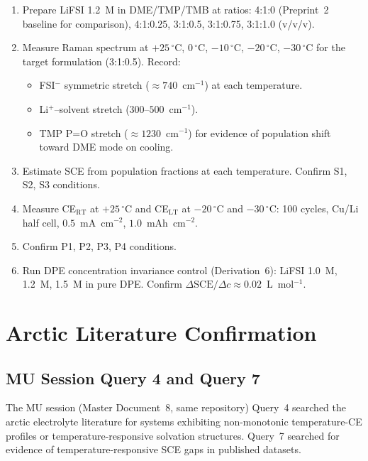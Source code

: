 \documentclass[11pt]{article}
\theoremstyle{plain}
\theoremstyle{definition}
\theoremstyle{remark}
\begin{document}
\begin{enumerate}[leftmargin=2em]
  \item Prepare LiFSI 1.2~M in DME/TMP/TMB at ratios:
        4:1:0 (Preprint~2 baseline for comparison),
        4:1:0.25, 3:1:0.5, 3:1:0.75, 3:1:1.0 (v/v/v).
  \item Measure Raman spectrum at $+25\,^\circ$C, $0\,^\circ$C,
        $-10\,^\circ$C, $-20\,^\circ$C, $-30\,^\circ$C for the
        target formulation (3:1:0.5).  Record:
    \begin{itemize}
      \item FSI$^-$ symmetric stretch ($\approx 740$~cm$^{-1}$)
            at each temperature.
      \item Li$^+$--solvent stretch ($300$--$500$~cm$^{-1}$).
      \item TMP P=O stretch ($\approx 1230$~cm$^{-1}$) for
            evidence of population shift toward DME mode on cooling.
    \end{itemize}
  \item Estimate SCE from population fractions at each temperature.
        Confirm S1, S2, S3 conditions.
  \item Measure CE$_\mathrm{RT}$ at $+25\,^\circ$C and
        CE$_\mathrm{LT}$ at $-20\,^\circ$C and $-30\,^\circ$C:
        100 cycles, Cu/Li half cell,
        $0.5$~mA~cm$^{-2}$, $1.0$~mAh~cm$^{-2}$.
  \item Confirm P1, P2, P3, P4 conditions.
  \item Run DPE concentration invariance control (Derivation~6):
        LiFSI 1.0~M, 1.2~M, 1.5~M in pure DPE.
        Confirm $\Delta\mathrm{SCE}/\Delta c \approx 0.02$~L~mol$^{-1}$.
\end{enumerate}

\section{Arctic Literature Confirmation}
\label{sec:literature}

\subsection{MU Session Query 4 and Query 7}

The MU session (Master Document~8, same repository) Query~4 searched
the arctic electrolyte literature for systems exhibiting
non-monotonic temperature-CE profiles or temperature-responsive
solvation structures.  Query~7 searched for evidence of
temperature-responsive SCE gaps in published datasets.
\end{document}
